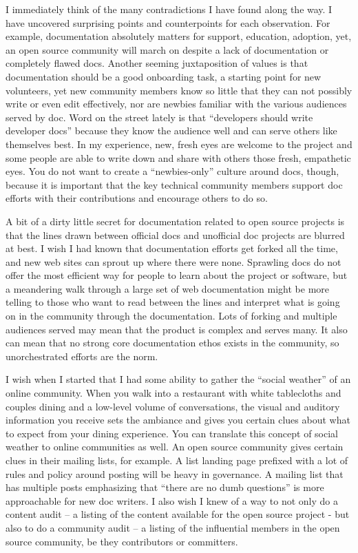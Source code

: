 I immediately think of the many contradictions I have found along the way. I have uncovered surprising points and counterpoints for each observation. For example, documentation absolutely matters for support, education, adoption, yet, an open source community will march on despite a lack of documentation or completely flawed docs. Another seeming juxtaposition of values is that documentation should be a good onboarding task, a starting point for new volunteers, yet new community members know so little that they can not possibly write or even edit effectively, nor are newbies familiar with the various audiences served by doc. Word on the street lately is that ``developers should write developer docs'' because they know the audience well and can serve others like themselves best. In my experience, new, fresh eyes are welcome to the project and some people are able to write down and share with others those fresh, empathetic eyes. You do not want to create a ``newbies-only'' culture around docs, though, because it is important that the key technical community members support doc efforts with their contributions and encourage others to do so. 

A bit of a dirty little secret for documentation related to open source projects is that the lines drawn between official docs and unofficial doc projects are blurred at best. I wish I had known that documentation efforts get forked all the time, and new web sites can sprout up where there were none. Sprawling docs do not offer the most efficient way for people to learn about the project or software, but a meandering walk through a large set of web documentation might be more telling to those who want to read between the lines and interpret what is going on in the community through the documentation. Lots of forking and multiple audiences served may mean that the product is complex and serves many. It also can mean that no strong core documentation ethos exists in the community, so unorchestrated efforts are the norm. 

I wish when I started that I had some ability to gather the ``social weather'' of an online community. When you walk into a restaurant with white tablecloths and couples dining and a low-level volume of conversations, the visual and auditory information you receive sets the ambiance and gives you certain clues about what to expect from your dining experience. You can translate this concept of social weather to online communities as well. An open source community gives certain clues in their mailing lists, for example. A list landing page prefixed with a lot of rules and policy around posting will be heavy in governance. A mailing list that has multiple posts emphasizing that ``there are no dumb questions'' is more approachable for new doc writers. I also wish I knew of a way to not only do a content audit -- a listing of the content available for the open source project - but also to do a community audit -- a listing of the influential members in the open source community, be they contributors or committers. 

